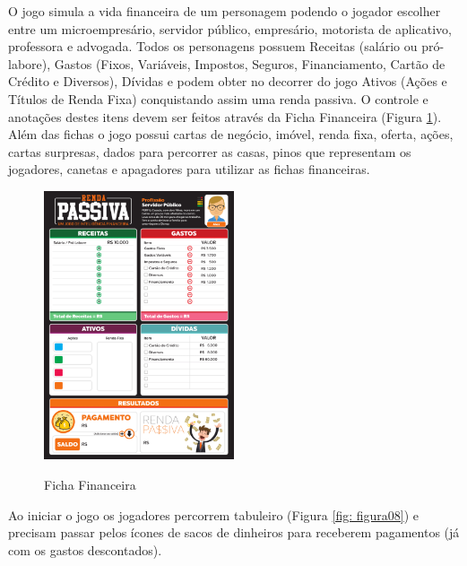 O jogo simula a vida financeira de um personagem podendo o jogador escolher entre um microempresário, servidor público, empresário, motorista de aplicativo, professora e advogada. Todos os personagens possuem Receitas (salário ou pró-labore), Gastos (Fixos, Variáveis, Impostos, Seguros, Financiamento, Cartão de Crédito e Diversos), Dívidas e podem obter no decorrer do jogo Ativos (Ações e Títulos de Renda Fixa) conquistando assim uma renda passiva. O controle e anotações destes itens devem ser feitos através da Ficha Financeira (Figura \ref{fig: figura07}). Além das fichas o jogo possui cartas de negócio, imóvel, renda fixa, oferta, ações, cartas surpresas, dados para percorrer as casas, pinos que representam os jogadores, canetas e apagadores para utilizar as fichas financeiras.

\graphicspath{{figuras/}}
\begin{figure}[!ht]
\centering
\begin{minipage}{1.\textwidth}
\caption{Ficha Financeira}
\centering
\includegraphics[width=0.5\textwidth]{07-figura_ficha-financeira-renda-passiva}
\label{fig: figura07}
\end{minipage}
\end{figure}

Ao iniciar o jogo os jogadores percorrem tabuleiro (Figura \ref{fig: figura08}) e precisam passar pelos ícones de sacos de dinheiros para receberem pagamentos (já com os gastos descontados).

